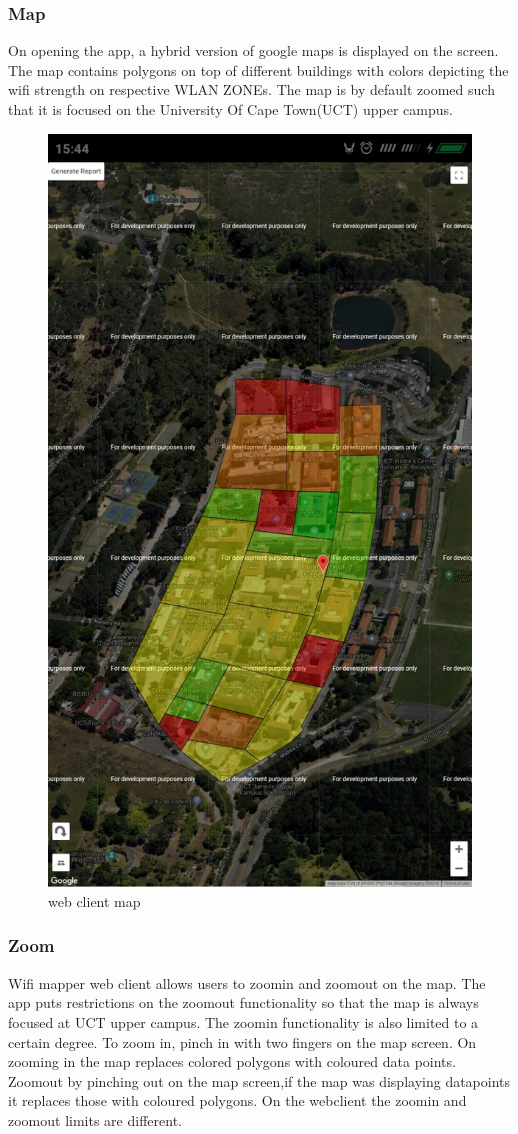 \subsubsection {Map}
On opening the app, a hybrid version of google maps is displayed on the screen. The map contains polygons on top of different buildings with colors depicting the wifi strength on respective WLAN ZONEs. The map is by default zoomed such that it is focused on the University Of Cape Town(UCT) upper campus.

\begin{figure}
	\centering
	\includegraphics[width=0.7\linewidth]{images_manual/web_map}
	\caption{web client map}
	\label{fig:webmap}
\end{figure}


\subsubsection {Zoom}
Wifi mapper web client allows users to zoomin and zoomout on the map. The app puts restrictions on the zoomout functionality so that the map is always focused at UCT upper campus. The zoomin functionality is also limited to a certain degree. To zoom in, pinch in with two fingers on the map screen. On zooming in the map replaces colored polygons with coloured data points. Zoomout by pinching out on the map screen,if the map was displaying datapoints it replaces those with coloured polygons. On the webclient the zoomin and zoomout limits are different.

